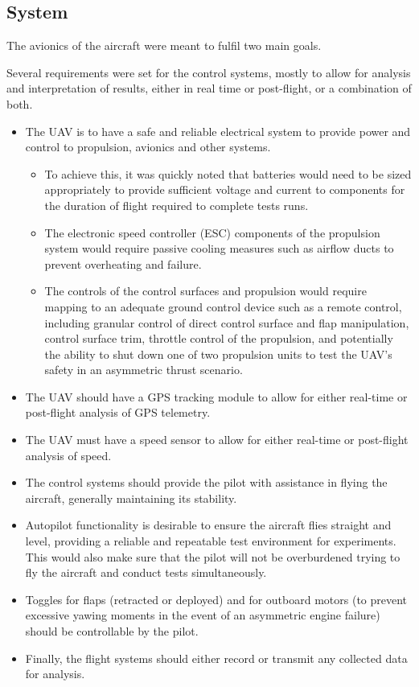 \documentclass[../../main.tex]{subfiles}
\begin{document}
\subsection{System} \label{sec:design-specification:requirements:system}

The avionics of the aircraft were meant to fulfil two main goals.

Several requirements were set for the control systems, mostly to allow for analysis and interpretation of results, either in real time or post-flight, or a combination of both. 

\begin{itemize}
    \item The UAV is to have a safe and reliable electrical system to provide power and control to propulsion, avionics and other systems.
        \begin{itemize}
            \item To achieve this, it was quickly noted that batteries would need to be sized appropriately to provide sufficient voltage and current to components for the duration of flight required to complete tests runs. 
            \item The electronic speed controller (ESC) components of the propulsion system would require passive cooling measures such as airflow ducts to prevent overheating and failure. 
            \item The controls of the control surfaces and propulsion would require mapping to an adequate ground control device such as a remote control, including granular control of direct control surface and flap manipulation, control surface trim, throttle control of the propulsion, and potentially the ability to shut down one of two propulsion units to test the UAV’s safety in an asymmetric thrust scenario. 
        \end{itemize}
    \item The UAV should have a GPS tracking module to allow for either real-time or post-flight analysis of GPS telemetry. 
    \item The UAV must have a speed sensor to allow for either real-time or post-flight analysis of speed. 
    \item The control systems should provide the pilot with assistance in flying the aircraft, generally maintaining its stability.
    \item Autopilot functionality is desirable to ensure the aircraft flies straight and level, providing a reliable and repeatable test environment for experiments.
    This would also make sure that the pilot will not be overburdened trying to fly the aircraft and conduct tests simultaneously.
    \item Toggles for flaps (retracted or deployed) and for outboard motors (to prevent excessive yawing moments in the event of an asymmetric engine failure) should be controllable by the pilot.
    \item Finally, the flight systems should either record or transmit any collected data for analysis.
\end{itemize}
\end{document}
